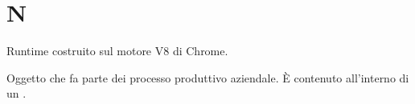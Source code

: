 \section{N}
Runtime  costruito sul motore V8 di Chrome.

Oggetto che fa parte dei processo produttivo aziendale. È contenuto all'interno di un .